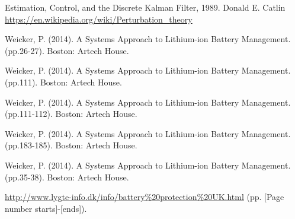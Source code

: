 \begin{thebibliography}{9}
Estimation, Control, and the Discrete Kalman Filter, 1989. Donald E. Catlin
  \url{https://en.wikipedia.org/wiki/Perturbation_theory}

Weicker, P. (2014). A Systems Approach to Lithium-ion Battery Management. (pp.26-27). Boston: Artech House. 

Weicker, P. (2014). A Systems Approach to Lithium-ion Battery Management. (pp.111). Boston: Artech House. 

Weicker, P. (2014). A Systems Approach to Lithium-ion Battery Management. (pp.111-112). Boston: Artech House.

Weicker, P. (2014). A Systems Approach to Lithium-ion Battery Management. (pp.183-185). Boston: Artech House.

Weicker, P. (2014). A Systems Approach to Lithium-ion Battery Management. (pp.35-38). Boston: Artech House.

  \url{http://www.lygte-info.dk/info/battery%20protection%20UK.html}
(pp. [Page number starts]-[ends]).

\end{thebibliography}
